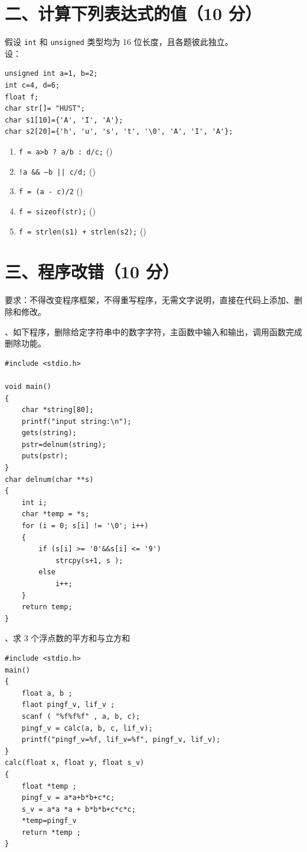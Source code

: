 \documentclass[UTF8,a4paper,10.5pt]{ctexart}
\newcommand{\ansbox}{\hfill(\qquad)}
\begin{document}
\section*{二、计算下列表达式的值（10 分）}

\noindent 假设 \texttt{int} 和 \texttt{unsigned} 类型均为 16 位长度，且各题彼此独立。\\
设：
\begin{lstlisting}
unsigned int a=1, b=2;
int c=4, d=6;
float f;
char str[]= "HUST";
char s1[10]={'A', 'I', 'A'};
char s2[20]={'h', 'u', 's', 't', '\0', 'A', 'I', 'A'};
\end{lstlisting}

\begin{enumerate}[label=(\arabic*), leftmargin=2.2em, itemsep=4pt]
    \item \texttt{f = a>b ? a/b : d/c;} \ansbox
    \item \texttt{!a \&\& --b || c/d;} \ansbox
    \item \texttt{f = (a - c)/2} \ansbox
    \item \texttt{f = sizeof(str);} \ansbox
    \item \texttt{f = strlen(s1) + strlen(s2);} \ansbox
\end{enumerate}

\section*{三、程序改错（10 分）}

\noindent 要求：不得改变程序框架，不得重写程序，无需文字说明，直接在代码上添加、删除和修改。

\medskip
{}、如下程序，删除给定字符串中的数字字符，主函数中输入和输出，调用函数完成删除功能。
\begin{lstlisting}
#include <stdio.h>

void main()
{
    char *string[80];
    printf("input string:\n");
    gets(string);
    pstr=delnum(string);
    puts(pstr);
}
char delnum(char **s)
{
    int i;
    char *temp = *s;
    for (i = 0; s[i] != '\0'; i++)
    {
        if (s[i] >= '0'&&s[i] <= '9')
            strcpy(s+1, s );
        else
            i++;
    }
    return temp;
}
\end{lstlisting}

\medskip
{}、求 3 个浮点数的平方和与立方和
\begin{lstlisting}
#include <stdio.h>
main()
{
    float a, b ;
    flaot pingf_v, lif_v ;
    scanf ( "%f%f%f" , a, b, c);
    pingf_v = calc(a, b, c, lif_v);
    printf("pingf_v=%f, lif_v=%f", pingf_v, lif_v);
}
calc(float x, float y, float s_v)
{
    float *temp ;
    pingf_v = a*a+b*b+c*c;
    s_v = a*a *a + b*b*b+c*c*c;
    *temp=pingf_v
    return *temp ;
}
\end{lstlisting}
\end{document}
